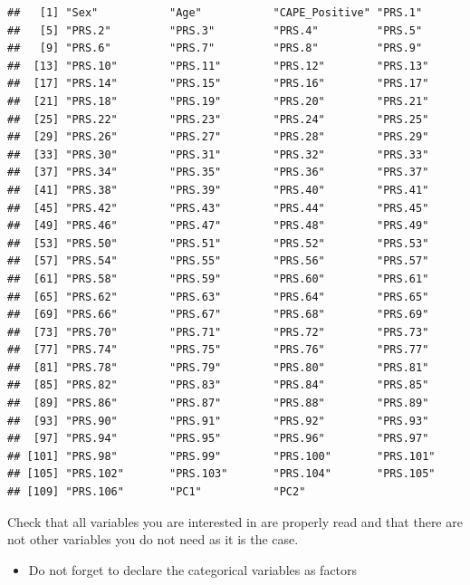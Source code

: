 \documentclass[
]{article}
\providecommand{\tightlist}{%
  \setlength{\itemsep}{0pt}\setlength{\parskip}{0pt}}
\begin{document}
\begin{verbatim}
##   [1] "Sex"           "Age"           "CAPE_Positive" "PRS.1"        
##   [5] "PRS.2"         "PRS.3"         "PRS.4"         "PRS.5"        
##   [9] "PRS.6"         "PRS.7"         "PRS.8"         "PRS.9"        
##  [13] "PRS.10"        "PRS.11"        "PRS.12"        "PRS.13"       
##  [17] "PRS.14"        "PRS.15"        "PRS.16"        "PRS.17"       
##  [21] "PRS.18"        "PRS.19"        "PRS.20"        "PRS.21"       
##  [25] "PRS.22"        "PRS.23"        "PRS.24"        "PRS.25"       
##  [29] "PRS.26"        "PRS.27"        "PRS.28"        "PRS.29"       
##  [33] "PRS.30"        "PRS.31"        "PRS.32"        "PRS.33"       
##  [37] "PRS.34"        "PRS.35"        "PRS.36"        "PRS.37"       
##  [41] "PRS.38"        "PRS.39"        "PRS.40"        "PRS.41"       
##  [45] "PRS.42"        "PRS.43"        "PRS.44"        "PRS.45"       
##  [49] "PRS.46"        "PRS.47"        "PRS.48"        "PRS.49"       
##  [53] "PRS.50"        "PRS.51"        "PRS.52"        "PRS.53"       
##  [57] "PRS.54"        "PRS.55"        "PRS.56"        "PRS.57"       
##  [61] "PRS.58"        "PRS.59"        "PRS.60"        "PRS.61"       
##  [65] "PRS.62"        "PRS.63"        "PRS.64"        "PRS.65"       
##  [69] "PRS.66"        "PRS.67"        "PRS.68"        "PRS.69"       
##  [73] "PRS.70"        "PRS.71"        "PRS.72"        "PRS.73"       
##  [77] "PRS.74"        "PRS.75"        "PRS.76"        "PRS.77"       
##  [81] "PRS.78"        "PRS.79"        "PRS.80"        "PRS.81"       
##  [85] "PRS.82"        "PRS.83"        "PRS.84"        "PRS.85"       
##  [89] "PRS.86"        "PRS.87"        "PRS.88"        "PRS.89"       
##  [93] "PRS.90"        "PRS.91"        "PRS.92"        "PRS.93"       
##  [97] "PRS.94"        "PRS.95"        "PRS.96"        "PRS.97"       
## [101] "PRS.98"        "PRS.99"        "PRS.100"       "PRS.101"      
## [105] "PRS.102"       "PRS.103"       "PRS.104"       "PRS.105"      
## [109] "PRS.106"       "PC1"           "PC2"
\end{verbatim}

Check that all variables you are interested in are properly read and
that there are not other variables you do not need as it is the case.

\bigskip

\begin{itemize}
\tightlist
\item
  Do not forget to declare the categorical variables as factors
\end{itemize}
\end{document}
